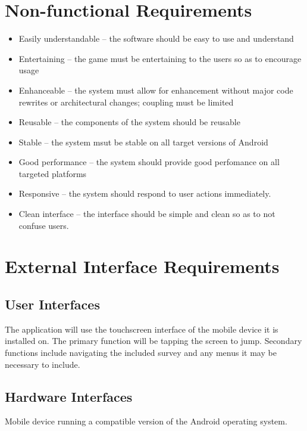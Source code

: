 \documentclass[a4wide]{article}
\begin{document}
\section{Non-functional Requirements}
\begin{itemize}
\item Easily understandable -- the software should be easy to use and understand
\item Entertaining -- the game must be entertaining to the users so as to
encourage usage
\item Enhanceable -- the system must allow for enhancement without major code
rewrites or architectural changes; coupling must be limited
\item Reusable -- the components of the system should be reusable
\item Stable -- the system msut be stable on all target versions of Android
\item Good performance -- the system should provide good perfomance on all
targeted platforms
\item Responsive -- the system should respond to user actions immediately.
\item Clean interface -- the interface should be simple and clean so as to not
confuse users.
\end{itemize}


\section{External Interface Requirements}

\subsection{User Interfaces}

The application will use the touchscreen interface of the mobile device it is
installed on.  The primary function will be tapping the screen to jump.
Secondary functions include navigating the included survey and any menus it may
be necessary to include.

\subsection{Hardware Interfaces}

Mobile device running a compatible version of the Android operating system.
\end{document}
